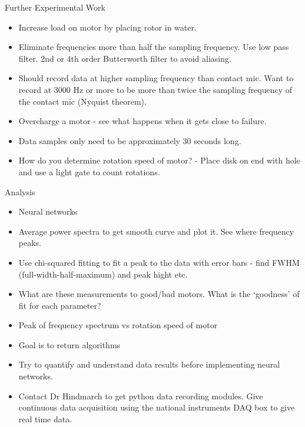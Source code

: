 \large{Further Experimental Work}
\begin{itemize}
\item
Increase load on motor by placing rotor in water.

\item
Eliminate frequencies more than half the sampling frequency. Use low pass filter. 2nd or 4th order Butterworth filter to avoid aliasing.

\item
Should record data at higher sampling frequency than contact mic. Want to record at 3000 Hz or more to be more than twice the sampling frequency of the contact mic (Nyquist theorem).

\item
Overcharge a motor - see what happens when it gets close to failure.

\item
Data samples only need to be approximately 30 seconds long.

\item
How do you determine rotation speed of motor? - Place disk on end with hole and use a light gate to count rotations.

\end{itemize}

\large{Analysis}
\begin{itemize}
\item
Neural networks

\item
Average power spectra to get smooth curve and plot it. See where frequency peaks.

\item
Use chi-squared fitting to fit a peak to the data with error bars - find FWHM (full-width-half-maximum) and peak hight etc.

\item
What are these measurements to good/bad motors. What is the `goodness' of fit for each parameter?

\item
Peak of frequency spectrum vs rotation speed of motor

\item
Goal is to return algorithms

\item
Try to quantify and understand data results before implementing neural networks.

\item
Contact Dr Hindmarch to get python data recording modules. Give continuous data acquisition using the national instruments DAQ box to give real time data.

\end{itemize}

